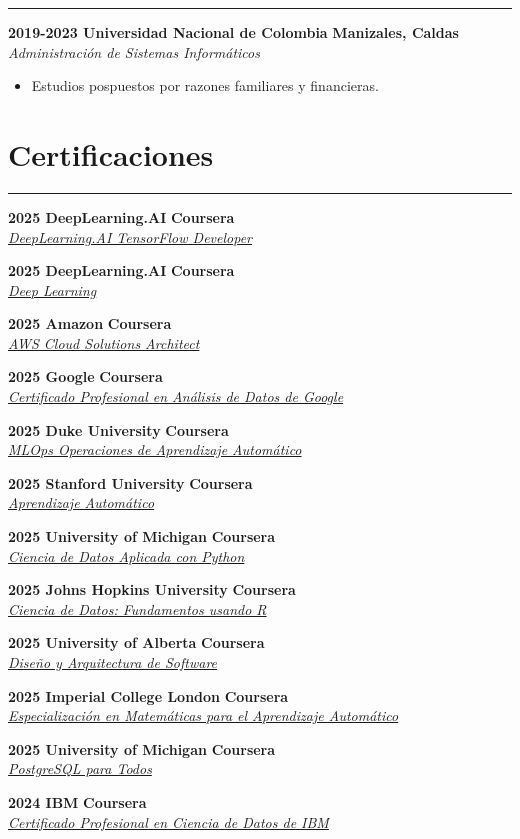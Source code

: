 \documentclass[9pt,a4paper]{article}
\newcommand{\cvevent}[4]{%
  {\noindent \textbf{#1 #2} \hfill \textbf{#3}\\%
   \textit{#4}\\[0pt]}%
}
\begin{document}
\noindent\rule{\linewidth}{0.5pt}

\cvevent{2019-2023}{Universidad Nacional de Colombia}{Manizales, Caldas}{Administración de Sistemas Informáticos}
\vspace{-\baselineskip}
\begin{itemize}[noitemsep, topsep=0pt]
    \item Estudios pospuestos por razones familiares y financieras.
\end{itemize}
\vspace{-\baselineskip}
\vspace{-\baselineskip}

\section*{Certificaciones}
\vspace{-\baselineskip}

\vspace{-\baselineskip}
\noindent\rule{\linewidth}{0.5pt}
\cvevent{2025}{DeepLearning.AI}{Coursera}{\href{https://www.coursera.org/account/accomplishments/specialization/83F9FK5OOPHM}{DeepLearning.AI TensorFlow Developer}}
\cvevent{2025}{DeepLearning.AI}{Coursera}{\href{https://www.coursera.org/account/accomplishments/specialization/1AZLWBHUEUP5}{Deep Learning}}
\cvevent{2025}{Amazon}{Coursera}{\href{https://www.coursera.org/account/accomplishments/specialization/DQ62CP3GJECK}{AWS Cloud Solutions Architect}}
\cvevent{2025}{Google}{Coursera}{\href{https://www.coursera.org/account/accomplishments/professional-cert/M8V0QULMQX4N}{Certificado Profesional en Análisis de Datos de Google}}
\cvevent{2025}{Duke University}{Coursera}{\href{https://www.coursera.org/account/accomplishments/specialization/9GW0O26FOENS}{MLOps \textbar{} Operaciones de Aprendizaje Automático}}
\cvevent{2025}{Stanford University}{Coursera}{\href{https://www.coursera.org/account/accomplishments/specialization/AC7NFFS0WXWP}{Aprendizaje Automático}}
\cvevent{2025}{University of Michigan}{Coursera}{\href{https://www.coursera.org/account/accomplishments/specialization/YVQ1D5MLFDQU}{Ciencia de Datos Aplicada con Python}}
\cvevent{2025}{Johns Hopkins University}{Coursera}{\href{https://www.coursera.org/account/accomplishments/specialization/MI5FUPDVP8JW}{Ciencia de Datos: Fundamentos usando R}}
\cvevent{2025}{University of Alberta}{Coursera}{\href{https://www.coursera.org/account/accomplishments/specialization/PMJQNHZRUFV0}{Diseño y Arquitectura de Software}}
\cvevent{2025}{Imperial College London}{Coursera}{\href{https://www.coursera.org/account/accomplishments/specialization/D7GUABT9DHUU}{Especialización en Matemáticas para el Aprendizaje Automático}}
\cvevent{2025}{University of Michigan}{Coursera}{\href{https://www.coursera.org/account/accomplishments/specialization/8KBK5UWK2HFK}{PostgreSQL para Todos}}
\cvevent{2024}{IBM}{Coursera}{\href{https://www.credly.com/badges/eeb6412f-cdff-4324-8399-8e6ca143ef9b}{Certificado Profesional en Ciencia de Datos de IBM}}
\vspace{-\baselineskip}
\vspace{-\baselineskip}
\vspace{-\baselineskip}
\end{document}
